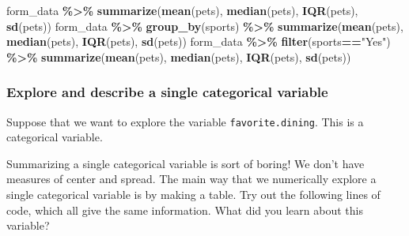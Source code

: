 \documentclass[
]{article}
\newenvironment{Shaded}{\begin{snugshade}}{\end{snugshade}}
\newcommand{\FunctionTok}[1]{\textcolor[rgb]{0.13,0.29,0.53}{\textbf{#1}}}
\newcommand{\NormalTok}[1]{#1}
\newcommand{\SpecialCharTok}[1]{\textcolor[rgb]{0.81,0.36,0.00}{\textbf{#1}}}
\newcommand{\StringTok}[1]{\textcolor[rgb]{0.31,0.60,0.02}{#1}}
\begin{document}
\begin{Shaded}
\begin{Highlighting}[]
\NormalTok{form\_data }\SpecialCharTok{\%\textgreater{}\%} \FunctionTok{summarize}\NormalTok{(}\FunctionTok{mean}\NormalTok{(pets), }\FunctionTok{median}\NormalTok{(pets), }\FunctionTok{IQR}\NormalTok{(pets), }\FunctionTok{sd}\NormalTok{(pets))}
\NormalTok{form\_data }\SpecialCharTok{\%\textgreater{}\%} \FunctionTok{group\_by}\NormalTok{(sports) }\SpecialCharTok{\%\textgreater{}\%} \FunctionTok{summarize}\NormalTok{(}\FunctionTok{mean}\NormalTok{(pets), }\FunctionTok{median}\NormalTok{(pets), }\FunctionTok{IQR}\NormalTok{(pets), }\FunctionTok{sd}\NormalTok{(pets))}
\NormalTok{form\_data }\SpecialCharTok{\%\textgreater{}\%} \FunctionTok{filter}\NormalTok{(sports}\SpecialCharTok{==}\StringTok{"Yes"}\NormalTok{) }\SpecialCharTok{\%\textgreater{}\%} \FunctionTok{summarize}\NormalTok{(}\FunctionTok{mean}\NormalTok{(pets), }\FunctionTok{median}\NormalTok{(pets), }\FunctionTok{IQR}\NormalTok{(pets), }\FunctionTok{sd}\NormalTok{(pets))}
\end{Highlighting}
\end{Shaded}

\subsubsection{Explore and describe a single categorical
variable}\label{explore-and-describe-a-single-categorical-variable}

Suppose that we want to explore the variable \texttt{favorite.dining}.
This is a categorical variable.

Summarizing a single categorical variable is sort of boring! We don't
have measures of center and spread. The main way that we numerically
explore a single categorical variable is by making a table. Try out the
following lines of code, which all give the same information. What did
you learn about this variable?

\begin{Shaded}
\end{Shaded}
\end{document}

